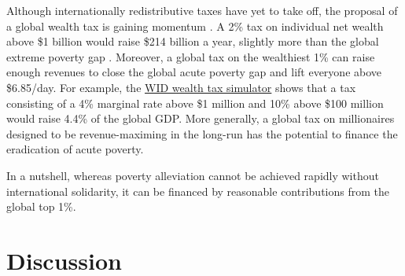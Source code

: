 
Although internationally redistributive taxes have yet to take off, the proposal of a global wealth tax is gaining momentum \citep{piketty_brief_2022}. A 2\% tax on individual net wealth above \$1 billion would raise \$214 billion a year, slightly more than the global extreme poverty gap \citep{alstadsaeter_global_2024}. Moreover, a global tax on the wealthiest 1\% can raise enough revenues to close the global acute poverty gap and lift everyone above \$6.85/day. For example, the \href{https://wid.world/world-wealth-tax-simulator}{WID wealth tax simulator} shows that a tax consisting of a 4\% marginal rate above \$1 million and 10\% above \$100 million would raise 4.4\% of the global GDP. More generally, a global tax on millionaires designed to be revenue-maximing in the long-run has the potential to finance the eradication of acute poverty. 

In a nutshell, whereas poverty alleviation cannot be achieved rapidly without international solidarity, it can be financed by reasonable contributions from the global top 1\%.

\section{Discussion} 

